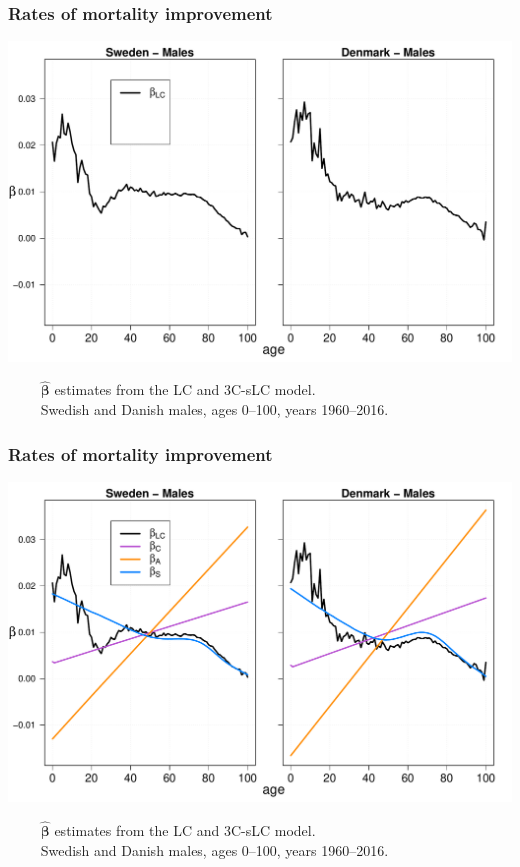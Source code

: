 \documentclass[12pt, xcolor=table]{beamer}  %
\begin{document}
\begin{frame}          
	\frametitle{Rates of mortality improvement}
	\begin{center}
		\includegraphics[scale=0.41]{Figures/Ch5/Beta1}
	\end{center}
	
	\vspace{-0.35cm}
\tiny{$\quad\quad$ $\bm{\hat{\beta}}$ estimates from the LC and 3C-sLC model. \\ $\quad\quad$ Swedish and Danish males, ages 0--100, years 1960--2016.}
\end{frame}

\begin{frame}[noframenumbering]           
	\frametitle{Rates of mortality improvement}
	\begin{center}
		\includegraphics[scale=0.41]{Figures/Ch5/Beta2}
	\end{center}
		\vspace{-0.35cm}
\tiny{$\quad\quad$ $\bm{\hat{\beta}}$ estimates from the LC and 3C-sLC model. \\ $\quad\quad$ Swedish and Danish males, ages 0--100, years 1960--2016.}

\end{frame}
\end{document}
